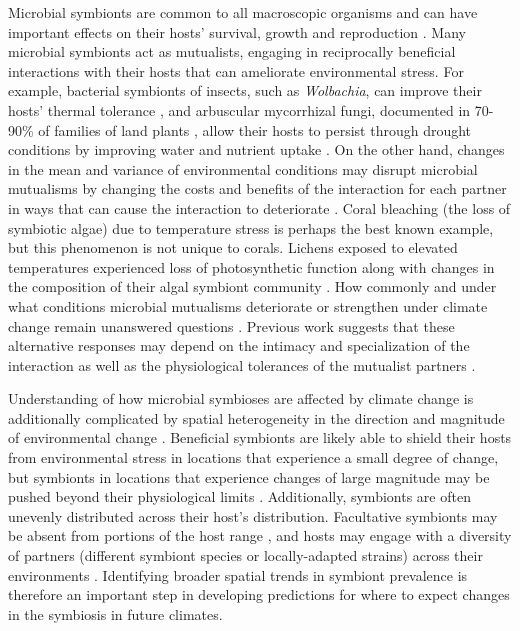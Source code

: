 \documentclass[11pt]{article}
\let\cite\citep
\begin{document}
Microbial symbionts are common to all macroscopic organisms and can have important effects on their hosts' survival, growth and reproduction \cite{rodriguez2009fungal,mcfall2013animals}.
Many microbial symbionts act as mutualists, engaging in reciprocally beneficial interactions with their hosts that can ameliorate environmental stress. 
For example, bacterial symbionts of insects, such as \emph{Wolbachia}, can improve their hosts' thermal tolerance \citep{truitt2019wolbachia, renoz2019evolutionary}, and arbuscular mycorrhizal fungi, documented in 70-90\% of families of land plants \citep{parniske2008arbuscular}, allow their hosts to persist through drought conditions by improving water and nutrient uptake \citep{cheng2021elucidating}.
On the other hand, changes in the mean and variance of environmental conditions may disrupt microbial  mutualisms by changing the costs and benefits of the interaction for each partner in ways that can cause the interaction to deteriorate \citep{aslan2013mutualism, fowler2024microbial}. 
Coral bleaching (the loss of symbiotic algae) due to temperature stress \citep{sully2019global} is perhaps the best known example, but this phenomenon is not unique to corals.
Lichens exposed to elevated temperatures experienced loss of photosynthetic function along with changes in the composition of their algal symbiont community \citep{meyer2022climate}.
How commonly and under what conditions microbial mutualisms deteriorate or strengthen under climate change remain unanswered questions \citep{frederickson2017mutualisms}.
Previous work suggests that these alternative responses may depend on the intimacy and specialization of the interaction as well as the physiological tolerances of the mutualist partners \citep{toby2010mutualisms, warren2014mutualism, rafferty2015phenological}. 

Understanding of how microbial symbioses are affected by climate change is additionally complicated by spatial heterogeneity in the direction and magnitude of environmental change \cite{ipcc_2021}. 
Beneficial symbionts are likely able to shield their hosts from environmental stress in locations that experience a small degree of change, but symbionts in locations that experience changes of large magnitude may be pushed beyond their physiological limits \cite{webster2008temperature}.
Additionally, symbionts are often unevenly distributed across their host's distribution.
Facultative symbionts may be absent from portions of the host range \cite{afkhami2014mutualist}, and hosts may engage with a diversity of partners (different symbiont species or locally-adapted strains) across their environments \cite{frade2008variation, rolshausen2018quantifying, fowler2023geographic}.
Identifying broader spatial trends in symbiont prevalence is therefore an important step in developing predictions for where to expect changes in the symbiosis in future climates.
\end{document}
